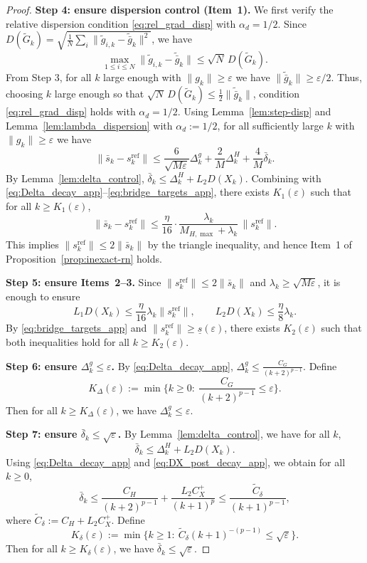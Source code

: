 \documentclass[review,onefignum,onetabnum]{siamart171218}
\begin{document}
\begin{proof}
		\smallskip
		\noindent\textbf{Step 4: ensure dispersion control (Item~1).}
		We first verify the relative dispersion condition \eqref{eq:rel_grad_disp} with $\alpha_d=1/2$.
		Since $D(\tilde G_k)=\sqrt{\frac1N\sum_i\|\tilde g_{i,k}-\tilde{\bar g}_k\|^2}$, we have
		\[
		\max_{1\le i\le N}\|\tilde g_{i,k}-\tilde{\bar g}_k\|
		\le \sqrt{N}\,D(\tilde G_k).
		\]
		From Step 3, for all $k$ large enough with $\|g_k\|\ge \varepsilon$ we have $\|\tilde{\bar g}_k\|\ge \varepsilon/2$.
		Thus, choosing $k$ large enough so that $\sqrt N\,D(\tilde G_k)\le \frac12\|\tilde{\bar g}_k\|$,
		condition \eqref{eq:rel_grad_disp} holds with $\alpha_d=1/2$.
		Using Lemma~\ref{lem:step-disp} and Lemma~\ref{lem:lambda_dispersion} with $\alpha_d:=1/2$,
		for all sufficiently large $k$ with $\|g_k\|\ge \varepsilon$ we have
		\[
		\|\bar s_k-s_k^{\mathrm{ref}}\|
		\le \frac{6}{\sqrt{M\varepsilon}}\Delta_k^g+\frac{2}{M}\Delta_k^H+\frac{4}{M}\bar\delta_k.
		\]
		By Lemma~\ref{lem:delta_control}, $\bar\delta_k\le \Delta_k^H+L_2D(X_k)$.
		Combining with \eqref{eq:Delta_decay_app}--\eqref{eq:bridge_targets_app}, there exists $K_1(\varepsilon)$ such that for all $k\ge K_1(\varepsilon)$,
		\[
		\|\bar s_k-s_k^{\mathrm{ref}}\|\le \frac{\eta}{16}\cdot \frac{\lambda_k}{M_{H,\max}+\lambda_k}\,\|s_k^{\mathrm{ref}}\|.
		\]
		This implies $\|s_k^{\mathrm{ref}}\|\le 2\|\bar s_k\|$ by the triangle inequality, and hence Item~1 of Proposition~\ref{prop:inexact-rn} holds.
		
		\smallskip
		\noindent\textbf{Step 5: ensure Items~2--3.}
		Since $\|s_k^{\mathrm{ref}}\|\le 2\|\bar s_k\|$ and $\lambda_k\ge \sqrt{M\varepsilon}$, it is enough to ensure
		\[
		L_1D(X_k)\le \frac{\eta}{16}\lambda_k\|s_k^{\mathrm{ref}}\|,
		\qquad
		L_2D(X_k)\le \frac{\eta}{8}\lambda_k.
		\]
		By \eqref{eq:bridge_targets_app} and $\|s_k^{\mathrm{ref}}\|\ge \underline s(\varepsilon)$, there exists $K_2(\varepsilon)$ such that both inequalities hold for all $k\ge K_2(\varepsilon)$.
		
		\smallskip
		\noindent\textbf{Step 6: ensure $\Delta_k^g\le \varepsilon$.}
		By \eqref{eq:Delta_decay_app}, $\Delta_k^g\le \frac{C_G}{(k+2)^{p-1}}$.
		Define
		\[
		K_\Delta(\varepsilon):=\min\Big\{k\ge 0:\ \frac{C_G}{(k+2)^{p-1}}\le \varepsilon\Big\}.
		\]
		Then for all $k\ge K_\Delta(\varepsilon)$, we have $\Delta_k^g\le \varepsilon$.
		
		\smallskip
		\noindent\textbf{Step 7: ensure $\bar\delta_k\le \sqrt{\varepsilon}$.}
		By Lemma~\ref{lem:delta_control}, we have for all $k$,
		\[
		\bar\delta_k\le \Delta_k^H + L_2D(X_k).
		\]
		Using \eqref{eq:Delta_decay_app} and \eqref{eq:DX_post_decay_app}, we obtain for all $k\ge 0$,
		\[
		\bar\delta_k
		\le \frac{C_H}{(k+2)^{p-1}}+\frac{L_2C_X^{+}}{(k+1)^p}
		\le \frac{\widetilde C_\delta}{(k+1)^{p-1}},
		\]
		where $\widetilde C_\delta:=C_H+L_2C_X^{+}$.
		Define
		\[
		K_\delta(\varepsilon):=\min\Big\{k\ge 1:\ \widetilde C_\delta (k+1)^{-(p-1)}\le \sqrt{\varepsilon}\Big\}.
		\]
		Then for all $k\ge K_\delta(\varepsilon)$, we have $\bar\delta_k\le \sqrt{\varepsilon}$.
		

\end{proof}
\end{document}
